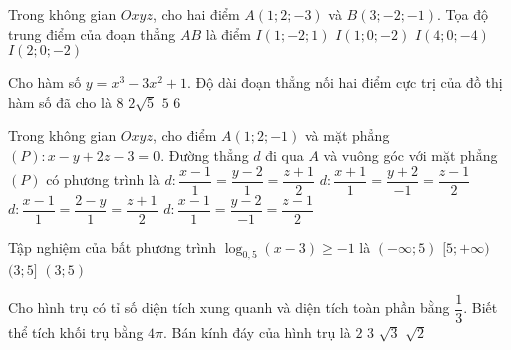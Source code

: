 \begin{ex}%
	Trong không gian $Oxyz$, cho hai điểm $A(1;2;-3)$ và $B(3;-2;-1)$. Tọa độ trung điểm  của đoạn thẳng $AB$ là điểm
	\choice
	{$I(1;-2;1)$}
	{$I(1;0;-2)$}
	{$I(4;0;-4)$}	
	{\True $I(2;0;-2)$}
\end{ex}
\begin{ex}%
	Cho hàm số $y=x^3-3x^2+1$. Độ dài đoạn thẳng nối hai điểm cực trị của đồ thị hàm số đã cho là
	\choice
	{$8$}	
	{\True $2\sqrt{5}$}
	{$5$}
	{$6$}
\end{ex}
\begin{ex}%
	Trong không gian $Oxyz$, cho điểm $A(1;2;-1)$ và mặt phẳng $(P)\colon x-y+2z-3=0$. Đường thẳng $d$ đi qua $A$ và vuông góc với mặt phẳng $(P)$ có phương trình là
	\choice
	{$d\colon\dfrac{x-1}{1}=\dfrac{y-2}{1}=\dfrac{z+1}{2}$}
	{$d\colon\dfrac{x+1}{1}=\dfrac{y+2}{-1}=\dfrac{z-1}{2}$}
	{\True $d\colon\dfrac{x-1}{1}=\dfrac{2-y}{1}=\dfrac{z+1}{2}$}
	{$d\colon\dfrac{x-1}{1}=\dfrac{y-2}{-1}=\dfrac{z-1}{2}$}
\end{ex}
\begin{ex}%
	Tập nghiệm của bất phương trình ${{\log }_{0,5}}(x-3)\ge -1$ là
	\choice
	{$(-\infty ;5)$}
	{$[5;+\infty )$}
	{\True $(3;5]$}
	{$(3;5)$}
\end{ex}
\begin{ex}%
	Cho hình trụ có tỉ số diện tích xung quanh và diện tích toàn phần bằng $\dfrac{1}{3}$. Biết thể tích khối trụ bằng $4\pi $. Bán kính đáy của hình trụ là
	\choice
	{\True $2$}
	{$3$}
	{$\sqrt{3}$}
	{$\sqrt{2}$}
\end{ex}
